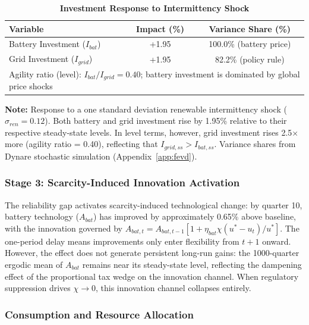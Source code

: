 	\begin{table}[H]
		\centering
		\caption[Investment Response to Intermittency Shock]{\textbf{Investment Response to Intermittency Shock}}
		\label{tab:agility_differential}
		\renewcommand{\arraystretch}{1.3}
		\begin{tabular}{l c c}
			\toprule
			\textbf{Variable} & \textbf{Impact (\%)} & \textbf{Variance Share (\%)} \\
			\midrule
			Battery Investment ($I_{bat}$) & +1.95 & 100.0\% (battery price) \\
			Grid Investment ($I_{grid}$) & +1.95 & 82.2\% (policy rule) \\
			\midrule
			\multicolumn{3}{p{13cm}}{Agility ratio (level): $I_{bat}/I_{grid} = 0.40$; battery investment is dominated by global price shocks} \\
			\bottomrule
		\end{tabular}
		\vspace{0.2cm}
		\parbox{\textwidth}{\footnotesize \textbf{Note:} Response to a one standard deviation renewable intermittency shock ($\sigma_{ren} = 0.12$). Both battery and grid investment rise by 1.95\% relative to their respective steady-state levels. In level terms, however, grid investment rises 2.5$\times$ more (agility ratio = 0.40), reflecting that $I_{grid,ss} > I_{bat,ss}$. Variance shares from Dynare stochastic simulation (Appendix~\ref{app:fevd}).}
	\end{table}
	
		
	
	\subsubsection{Stage 3: Scarcity-Induced Innovation Activation}
	
	The reliability gap activates scarcity-induced technological change: by quarter 10, battery technology ($A_{bat}$) has improved by approximately 0.65\% above baseline, with the innovation governed by $A_{bat,t} = A_{bat,t-1}[1 + \eta_{bat}\chi(u^*-u_t)/u^*]$. The one-period delay means improvements only enter flexibility from $t+1$ onward. However, the effect does not generate persistent long-run gains: the 1000-quarter ergodic mean of $A_{bat}$ remains near its steady-state level, reflecting the dampening effect of the proportional tax wedge on the innovation channel. When regulatory suppression drives $\chi \to 0$, this innovation channel collapses entirely.
	
	\subsubsection{Consumption and Resource Allocation}
	
